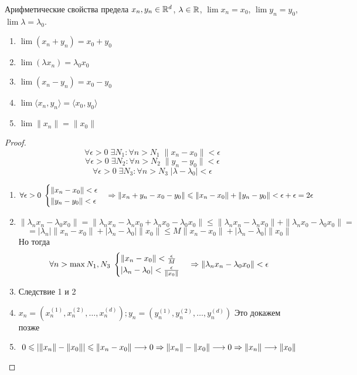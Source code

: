 \begin{theorem}{Арифметические свойства предела}
$x_n, y_n \in \mathbb{R}^d$, $\lambda \in \mathbb{R}$, $\lim x_n = x_0$, $\lim y_n = y_0$, $\lim \lambda = \lambda_0$.
\begin{enumerate}
\item $\lim (x_n + y_n) = x_0 + y_0$
\item $\lim (\lambda x_n) = \lambda_0x_0$
\item $\lim (x_n - y_n) = x_0 - y_0$
\item $\lim \langle x_n, y_n\rangle = \langle x_0, y_0\rangle$
\item $\lim \|x_n\| = \|x_0\|$
\end{enumerate}
\end{theorem}
\begin{proof}
$$\forall \epsilon > 0\; \exists N_1\colon \forall n > N_1\; \|x_n - x_0\| < \epsilon$$
$$\forall \epsilon > 0\; \exists N_2\colon \forall n > N_2\; \|y_n - y_0\| < \epsilon$$
$$\forall \epsilon > 0\; \exists N_3\colon \forall n > N_3\; |\lambda - \lambda_0| < \epsilon$$
\begin{enumerate}
\item $$\forall \epsilon > 0\;\begin{cases}\|x_n-x_0\| < \epsilon \\ \|y_n-y_0\| < \epsilon\end{cases} \Rightarrow 
\|x_n + y_n - x_0 - y_0\| \leqslant \|x_n - x_0\| + \|y_n - y_0\| < \epsilon + \epsilon = 2\epsilon$$
\item $$\|\lambda_nx_n-\lambda_0x_0\| = \|\lambda_nx_n - \lambda_nx_0 + \lambda_nx_0 - \lambda_0x_0\| \leqslant
\|\lambda_nx_n - \lambda_nx_0\|+\|\lambda_nx_0-\lambda_0x_0\| = $$
$$ = |\lambda_n| \|x_n-x_0\| + |\lambda_n - \lambda_0| \|x_0\| \leqslant
M \|x_n-x_0\| + |\lambda_n - \lambda_0| \|x_0\|$$
Но тогда
$$\forall n > \max{N_1, N_3}\; \begin{cases}\|x_n-x_0\| < \frac{\epsilon}M \\ |\lambda_n - \lambda_0| < \frac{\epsilon}{\|x_0\|}\end{cases} \Rightarrow
\|\lambda_nx_n-\lambda_0x_0\| < \epsilon$$
\item Следствие 1 и 2
\item $x_n = \left(x_n^{(1)}, x_n^{(2)}, \ldots, x_n^{(d)}\right); y_n = \left(y_n^{(1)}, y_n^{(2)}, \ldots, y_n^{(d)}\right)$
Это докажем позже
\item $$0 \leqslant \left|\|x_n\|-\|x_0\|\right| \leqslant \|x_n-x_0\| \longrightarrow 0 \Rightarrow \|x_n\| - \|x_0\| \longrightarrow 0 \Rightarrow \|x_n\| \longrightarrow \|x_0\|$$
\end{enumerate}
\end{proof}


